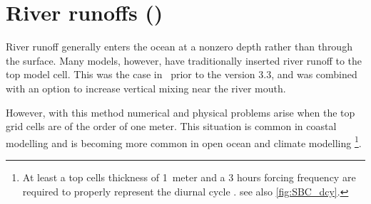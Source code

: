 \documentclass[../main/NEMO_manual]{subfiles}
\begin{document}
\section[River runoffs (\textit{sbcrnf.F90})]{River runoffs (\protect{})}
\label{sec:SBC_rnf}

\begin{listing}
  \caption{}
  \label{lst:namsbc_rnf}
\end{listing}



River runoff generally enters the ocean at a nonzero depth rather than through the surface.
Many models, however, have traditionally inserted river runoff to the top model cell.
This was the case in \NEMO\ prior to the version 3.3,
and was combined with an option to increase vertical mixing near the river mouth.

However, with this method numerical and physical problems arise when the top grid cells are of the order of one meter.
This situation is common in coastal modelling and is becoming more common in open ocean and climate modelling
\footnote{
  At least a top cells thickness of 1~meter and a 3 hours forcing frequency are required to
  properly represent the diurnal cycle \citep{bernie.woolnough.ea_JC05}.
  see also \autoref{fig:SBC_dcy}.}.
\end{document}
